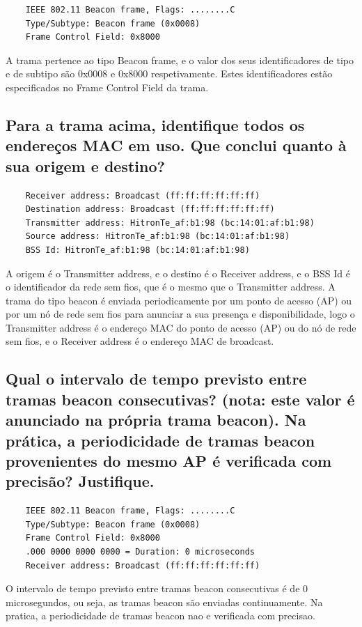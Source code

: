 \documentclass{article}
\begin{document}
\begin{verbatim}
    IEEE 802.11 Beacon frame, Flags: ........C
    Type/Subtype: Beacon frame (0x0008)
    Frame Control Field: 0x8000
\end{verbatim}
A trama pertence ao tipo Beacon frame, e o valor dos seus identificadores de tipo e de subtipo são 0x0008 e 0x8000 respetivamente. Estes identificadores estão especificados no Frame Control Field da trama.

\subsection{Para a trama acima, identifique todos os endereços MAC em uso. Que conclui  quanto à sua origem e destino?}

\begin{verbatim}
    Receiver address: Broadcast (ff:ff:ff:ff:ff:ff)
    Destination address: Broadcast (ff:ff:ff:ff:ff:ff)
    Transmitter address: HitronTe_af:b1:98 (bc:14:01:af:b1:98)
    Source address: HitronTe_af:b1:98 (bc:14:01:af:b1:98)
    BSS Id: HitronTe_af:b1:98 (bc:14:01:af:b1:98)
\end{verbatim}

A origem é o Transmitter address, e o destino é o Receiver address, e o BSS Id é o identificador da rede sem fios, que é o mesmo que o Transmitter address.
A trama do tipo beacon é enviada periodicamente por um ponto de acesso (AP) ou por um nó de rede sem fios para anunciar a sua presença e disponibilidade, logo o Transmitter address é o endereço MAC do ponto de acesso (AP) ou do nó de rede sem fios, e o Receiver address é o endereço MAC de broadcast.

\subsection{Qual o intervalo de tempo previsto entre tramas beacon consecutivas?  (nota:  este valor é anunciado na própria trama beacon). Na prática, a periodicidade de  tramas beacon provenientes do mesmo AP é verificada com precisão? Justifique.}

\begin{verbatim}
    IEEE 802.11 Beacon frame, Flags: ........C
    Type/Subtype: Beacon frame (0x0008)
    Frame Control Field: 0x8000
    .000 0000 0000 0000 = Duration: 0 microseconds
    Receiver address: Broadcast (ff:ff:ff:ff:ff:ff)
\end{verbatim}

O intervalo de tempo previsto entre tramas beacon consecutivas é de 0 microsegundos, ou seja, as tramas beacon são enviadas continuamente.
Na pratica, a periodicidade de tramas beacon nao e verificada com precisao.
\end{document}
